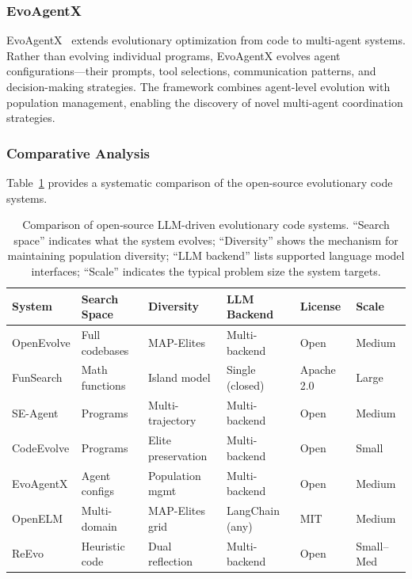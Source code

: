 \subsubsection{EvoAgentX}

EvoAgentX~\citep{evoagentx2024} extends evolutionary optimization from code to multi-agent systems. Rather than evolving individual programs, EvoAgentX evolves agent configurations---their prompts, tool selections, communication patterns, and decision-making strategies. The framework combines agent-level evolution with population management, enabling the discovery of novel multi-agent coordination strategies.

\subsubsection{Comparative Analysis}

Table~\ref{tab:opensource-comparison} provides a systematic comparison of the open-source evolutionary code systems.

\begin{table}[t]
\centering
\caption{Comparison of open-source LLM-driven evolutionary code systems. ``Search space'' indicates what the system evolves; ``Diversity'' shows the mechanism for maintaining population diversity; ``LLM backend'' lists supported language model interfaces; ``Scale'' indicates the typical problem size the system targets.}
\label{tab:opensource-comparison}
\small
\begin{tabular}{@{}llllll@{}}
\toprule
\textbf{System} & \textbf{Search Space} & \textbf{Diversity} & \textbf{LLM Backend} & \textbf{License} & \textbf{Scale} \\
\midrule
OpenEvolve & Full codebases & MAP-Elites & Multi-backend & Open & Medium \\
FunSearch & Math functions & Island model & Single (closed) & Apache 2.0 & Large \\
SE-Agent & Programs & Multi-trajectory & Multi-backend & Open & Medium \\
CodeEvolve & Programs & Elite preservation & Multi-backend & Open & Small \\
EvoAgentX & Agent configs & Population mgmt & Multi-backend & Open & Medium \\
OpenELM & Multi-domain & MAP-Elites grid & LangChain (any) & MIT & Medium \\
ReEvo & Heuristic code & Dual reflection & Multi-backend & Open & Small--Med \\
\bottomrule
\end{tabular}
\end{table}

